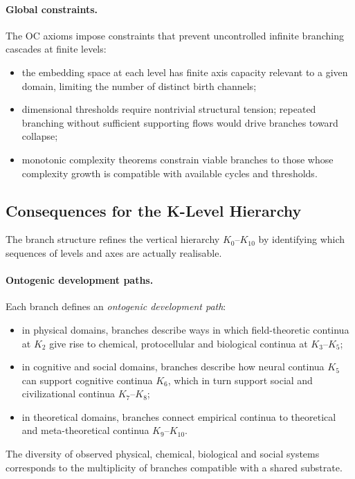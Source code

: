 \paragraph{Global constraints.}
The OC axioms impose constraints that prevent uncontrolled infinite branching
cascades at finite levels:
\begin{itemize}
  \item the embedding space at each level has finite axis capacity relevant
        to a given domain, limiting the number of distinct birth channels;
  \item dimensional thresholds require nontrivial structural tension; repeated
        branching without sufficient supporting flows would drive branches
        toward collapse;
  \item monotonic complexity theorems constrain viable branches to those
        whose complexity growth is compatible with available cycles and
        thresholds.
\end{itemize}

\subsection{Consequences for the K-Level Hierarchy}

The branch structure refines the vertical hierarchy \(K_0\)–\(K_{10}\) by
identifying which sequences of levels and axes are actually realisable.

\paragraph{Ontogenic development paths.}
Each branch defines an \emph{ontogenic development path}:
\begin{itemize}
  \item in physical domains, branches describe ways in which field-theoretic
        continua at \(K_2\) give rise to chemical, protocellular and
        biological continua at \(K_3\)–\(K_5\);
  \item in cognitive and social domains, branches describe how neural
        continua \(K_5\) can support cognitive continua \(K_6\), which in
        turn support social and civilizational continua \(K_7\)–\(K_8\);
  \item in theoretical domains, branches connect empirical continua to
        theoretical and meta-theoretical continua \(K_9\)–\(K_{10}\).
\end{itemize}
The diversity of observed physical, chemical, biological and social systems
corresponds to the multiplicity of branches compatible with a shared
substrate.

